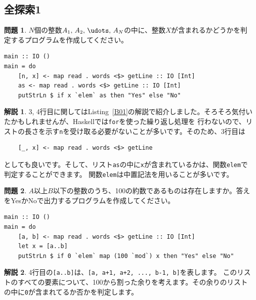 \documentclass[12pt,a4paper,dvipdfmx,fleqn]{article}%
\theoremstyle{definition}
\newtheorem*{toi*}{問題}
\theoremstyle{definition}
\newtheorem*{ans*}{解説}
\theoremstyle{definition}
\begin{document}
\subsection{全探索1}\label{全探索1}
\begin{toi*}
    $N$個の整数$A_1,\,A_2,\,\udots,\,A_N$の中に、整数$X$が含まれるかどうかを判定するプログラムを作成してください。
\end{toi*}
\begin{lstlisting}[caption=A02.hs,label=A02]
main :: IO ()
main = do
    [n, x] <- map read . words <$> getLine :: IO [Int]
    as <- map read . words <$> getLine :: IO [Int]
    putStrLn $ if x `elem` as then "Yes" else "No"
\end{lstlisting}
\begin{ans*}
    3, 4行目に関してはListing~\ref{B01}の解説で紹介しました。そろそろ気付いたかもしれませんが、Haskellでは\texttt{for}を使った繰り返し処理を
    行わないので、リストの長さを示す\texttt{n}を受け取る必要がないことが多いです。そのため、3行目は
    \begin{verbatim}
    [_, x] <- map read . words <$> getLine
    \end{verbatim}
    \vspace*{-4mm}
    としても良いです。そして、リスト\texttt{as}の中に\texttt{x}が含まれているかは、関数\texttt{elem}で判定することができます。
    関数\texttt{elem}は中置記法を用いることが多いです。
\end{ans*}
\begin{toi*}
    $A$以上$B$以下の整数のうち、100の約数であるものは存在しますか。答えをYesかNoで出力するプログラムを作成してください。
\end{toi*}
\begin{lstlisting}[caption=B02.hs,label=B02]
main :: IO ()
main = do
    [a, b] <- map read . words <$> getLine :: IO [Int]
    let x = [a..b]
    putStrLn $ if 0 `elem` map (100 `mod`) x then "Yes" else "No"
\end{lstlisting}
\begin{ans*}
    4行目の\texttt{[a..b]}は、\texttt{[a, a+1, a+2, ..., b-1, b]}を表します。
    このリストのすべての要素について、100から割った余りを考えます。その余りのリストの中に\texttt{0}が含まれてるか否かを判定します。
\end{ans*}
\end{document}
